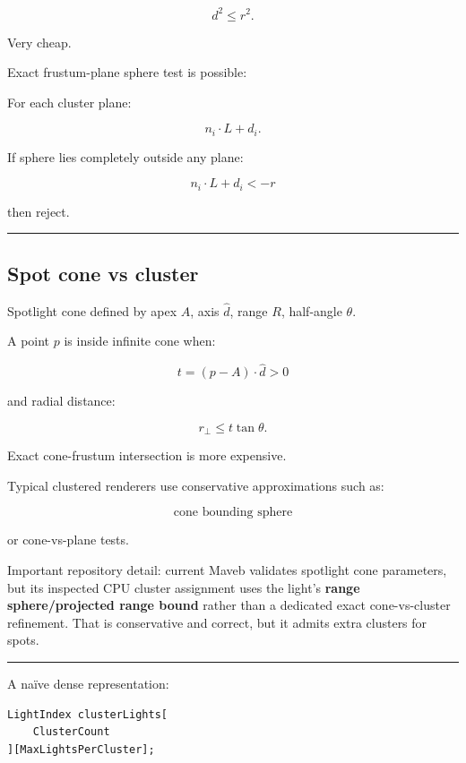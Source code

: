\[
\boxed{
d^2\le r^2.
}
\]

Very cheap.

Exact frustum-plane sphere test is possible:

For each cluster plane:

\[
n_i\cdot L+d_i.
\]

If sphere lies completely outside any plane:

\[
n_i\cdot L+d_i<-r
\]

then reject.

\begin{center}\rule{0.5\linewidth}{0.5pt}\end{center}

\subsection{Spot cone vs cluster}\label{04-visual-computing-ii-ch040-spot-cone-vs-cluster}

\hypertarget{04-visual-computing-ii-ch040-spot-cone-vs-cluster}{}

Spotlight cone defined by apex \(A\), axis \(\hat d\), range \(R\), half-angle \(\theta\).

A point \(p\) is inside infinite cone when:

\[
t=
(p-A)\cdot\hat d>0
\]

and radial distance:

\[
r_\perp
\le
t\tan\theta.
\]

Exact cone-frustum intersection is more expensive.

Typical clustered renderers use conservative approximations such as:

\[
\text{cone bounding sphere}
\]

or cone-vs-plane tests.

Important repository detail: current Maveb validates spotlight cone parameters, but its inspected CPU cluster assignment uses the light's \textbf{range sphere/projected range bound} rather than a dedicated exact cone-vs-cluster refinement. That is conservative and correct, but it admits extra clusters for spots.

\begin{center}\rule{0.5\linewidth}{0.5pt}\end{center}

A naïve dense representation:

\begin{verbatim}
LightIndex clusterLights[
    ClusterCount
][MaxLightsPerCluster];
\end{verbatim}

